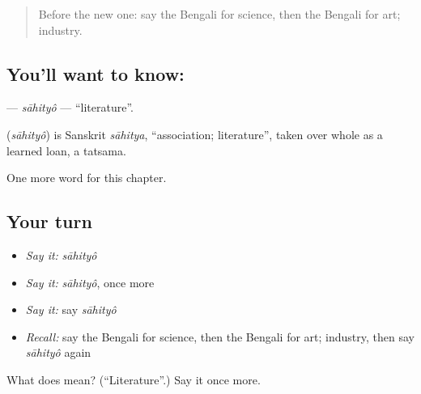 \begin{quote}
Before the new one: say the Bengali for science, then the Bengali for art; industry.
\end{quote}

\subsection*{You'll want to know: }
\textbf{} — \emph{sāhityô} — \textquotedblleft{}literature\textquotedblright{}.

\begin{cousinweb}
\textbf{} (\emph{sāhityô}) is Sanskrit \emph{sāhitya}, \textquotedblleft{}association; literature\textquotedblright{}, taken over whole as a learned loan, a tatsama.
\end{cousinweb}

\begin{grammarlens}[title={What you've built}]
One more word for this chapter.
\end{grammarlens}

\subsection*{Your turn}
\begin{itemize}
\raggedright
  \item \emph{Say it:} \emph{sāhityô}
  \item \emph{Say it:} \emph{sāhityô}, once more
  \item \emph{Say it:} say \emph{sāhityô}
  \item \emph{Recall:} say the Bengali for science, then the Bengali for art; industry, then say \emph{sāhityô} again
\end{itemize}

\begin{tcolorbox}[breakable,colback=teal!4,colframe=teal!35!black,title={Before you move on}]
What does  mean? (\textquotedblleft{}Literature\textquotedblright{}.) Say it once more.
\end{tcolorbox}
